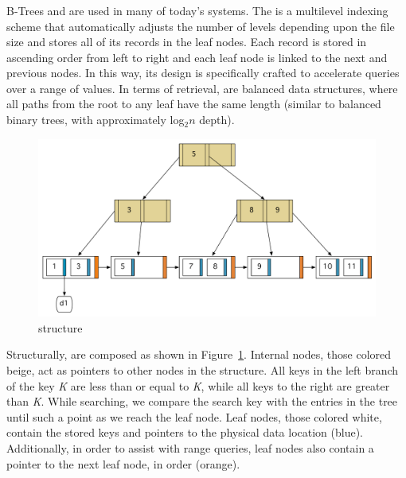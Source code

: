\subsubsection{\bptrees} %
\label{subsub:b_trees}
B-Trees and \bptrees are used in many of today's systems. The \bptree is a
multilevel indexing scheme that automatically adjusts the number of levels
depending upon the file size and stores all of its records in the leaf nodes.
Each record is stored in ascending order from left to right and each leaf node
is linked to the next and previous nodes. In this way, its design is
specifically crafted to accelerate queries over a range of
values\cite{navathe,ullman}. In terms of retrieval, \bptrees are balanced data
structures, where all paths from the root to any leaf have the same length
(similar to balanced binary trees, with approximately log$_2 n$ depth).

\begin{figure}
\begin{center}
\includegraphics[scale=0.5]{figures/bplustree.pdf}
\end{center}
\caption{\bptree structure}
\label{fig:bplustree}
\end{figure}

Structurally, \bptrees are composed as shown in Figure~\ref{fig:bplustree}.
Internal nodes, those colored beige, act as pointers to other nodes in the
structure. All keys in the left branch of the key \emph{K} are less than or
equal to \emph{K}, while all keys to the right are greater than \emph{K}. While
searching, we compare the search key with the entries in the tree until such a
point as we reach the leaf node. Leaf nodes, those colored white, contain the
stored keys and pointers to the physical data location (blue). Additionally, in
order to assist with range queries, leaf nodes also contain a pointer to the
next leaf node, in order (orange).

